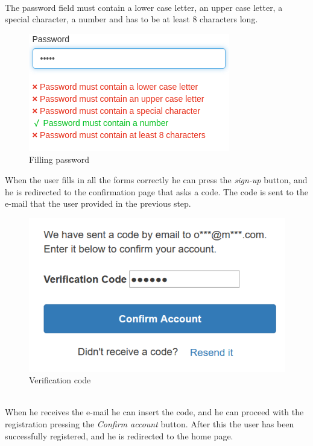 \\
The password field must contain a lower case letter, an upper case letter, a special character, a number and has to be at least 8 characters long.
\begin{figure}[!ht]
    \caption{Filling password}
    \vspace{10px}
    \includegraphics[scale=0.5]{../../../../Images/userManual/insertPWD.png}
    \centering
\end{figure}
\newpage
When the user fills in all the forms correctly he can press the \textit{sign-up} button, and he is redirected to the confirmation page that asks a code.
The code is sent to the e-mail that the user provided in the previous step.
\begin{figure}[!ht]
    \caption{Verification code}
    \vspace{10px}
    \includegraphics[scale=0.3]{../../../../Images/userManual/confermationCode.png}
    \centering
\end{figure}
\\
When he receives the e-mail he can insert the code, and he can proceed with the registration pressing the \textit{Confirm account} button. After this the user has been successfully registered, and he is redirected to the home page.

